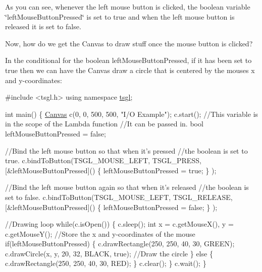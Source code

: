 As you can see, whenever the left mouse button is clicked, the boolean variable \char`\"{}left\+Mouse\+Button\+Pressed\char`\"{} is set to true and when the left mouse button is released it is set to false.

Now, how do we get the Canvas to draw stuff once the mouse button is clicked?

In the conditional for the boolean {\ttfamily left\+Mouse\+Button\+Pressed}, if it has been set to {\ttfamily true} then we can have the Canvas draw a circle that is centered by the mouse\textquotesingle{}s x and y-\/coordinates\+:


\begin{DoxyCode}
\textcolor{preprocessor}{#include <tsgl.h>}
\textcolor{keyword}{using namespace }\hyperlink{namespacetsgl}{tsgl};

\textcolor{keywordtype}{int} main() \{
  \hyperlink{classtsgl_1_1_canvas}{Canvas} c(0, 0, 500, 500, \textcolor{stringliteral}{"I/O Example"});
  c.start();
  \textcolor{comment}{//This variable is in the scope of the Lambda function }
  \textcolor{comment}{//It can be passed in.}
  \textcolor{keywordtype}{bool} leftMouseButtonPressed = \textcolor{keyword}{false};

  \textcolor{comment}{//Bind the left mouse button so that when it's pressed}
  \textcolor{comment}{//the boolean is set to true.}
  c.bindToButton(TSGL\_MOUSE\_LEFT, TSGL\_PRESS, 
                    [&leftMouseButtonPressed]() \{
                          leftMouseButtonPressed = \textcolor{keyword}{true};
                    \}
                );

  \textcolor{comment}{//Bind the left mouse button again so that when it's released }
  \textcolor{comment}{//the boolean is set to false.}
  c.bindToButton(TSGL\_MOUSE\_LEFT, TSGL\_RELEASE, 
                    [&leftMouseButtonPressed]() \{
                          leftMouseButtonPressed = \textcolor{keyword}{false};
                    \}
                );

  \textcolor{comment}{//Drawing loop}
  \textcolor{keywordflow}{while}(c.isOpen()) \{
    c.sleep();
    \textcolor{keywordtype}{int} x = c.getMouseX(), y = c.getMouseY();  \textcolor{comment}{//Store the x and y-coordinates of the mouse}
    \textcolor{keywordflow}{if}(leftMouseButtonPressed) \{
      c.drawRectangle(250, 250, 40, 30, GREEN);
      c.drawCircle(x, y, 20, 32, BLACK, \textcolor{keyword}{true});  \textcolor{comment}{//Draw the circle}
    \} \textcolor{keywordflow}{else} \{
      c.drawRectangle(250, 250, 40, 30, RED);
    \}
    c.clear();
  \}
  c.wait();
\}
\end{DoxyCode}


